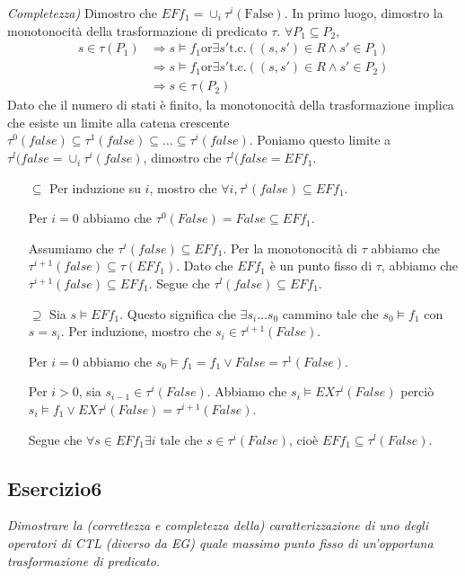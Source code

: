 \documentclass[12pt]{article}
\begin{document}
\medskip

\textit{Completezza)} Dimostro che $EF f_1 = \cup_i \tau^i(\textrm{False})$.
In primo luogo, dimostro la monotonocità della trasformazione di predicato $\tau$. $\forall P_1 \subseteq P_2$,
\begin{align*}
s\in \tau(P_1) &\Rightarrow s \models f_1 \textrm{or} \exists s' \textrm{t.c.} ((s,s') \in R \land s' \in P_1)\\
               &\Rightarrow s \models f_1 \textrm{or} \exists s' \textrm{t.c.} ((s,s') \in R \land s' \in P_2)\\
			   &\Rightarrow s\in \tau(P_2)
\end{align*}
Dato che il numero di stati è finito, la monotonocità della trasformazione implica che esiste un limite alla catena crescente $\tau^0(false) \subseteq \tau^1(false) \subseteq \ldots \subseteq \tau^i(false)$.
Poniamo questo limite a $\tau^l(false=\cup_i \tau^i(false)$, dimostro che $\tau^l(false=EF f_1$.
\begin{itemize}
\item[$\subseteq$] Per induzione su $i$, mostro che $\forall i, \tau^i(false) \subseteq EF f_1$.

	Per $i=0$ abbiamo che $\tau^0(False) = False \subseteq EF f_1$.
	
	Assumiamo che $\tau^i(false) \subseteq EF f_1$. Per la monotonocità di $\tau$ abbiamo che $\tau^{i+1}(false) \subseteq \tau(EF f_1)$. Dato che $EF f_1$ è un punto fisso di $\tau$, abbiamo che $\tau^{i+1}(false) \subseteq EF f_1$. Segue che $\tau^l(false) \subseteq EF f_1$.
\item[$\supseteq$] Sia $s \models EF f_1$. Questo significa che $\exists s_i \ldots s_0$ cammino tale che $s_0 \models f_1$ con $s = s_i$. Per induzione, mostro che $s_i \in \tau^{i+1}(False)$.

	Per $i=0$ abbiamo che $s_0 \models f_1 = f_1 \lor False = \tau^1(False)$.
	
	Per $i>0$, sia $s_{i-1} \in \tau^i(False)$. Abbiamo che $s_i \models EX\tau^i(False)$ perciò $s_i \models f_1 \lor EX\tau^i(False)=\tau^{i+1}(False)$.
	
	Segue che $\forall s \in EF f_1 \exists i$ tale che $s \in \tau^i(False)$, cioè $EF f_1 \subseteq \tau^l(False)$.
\end{itemize}


\subsection*{Esercizio6}
\textit{Dimostrare la (correttezza e completezza della) caratterizzazione di uno degli operatori di CTL (diverso da EG) quale massimo punto fisso di un’opportuna trasformazione di predicato.}
\end{document}
